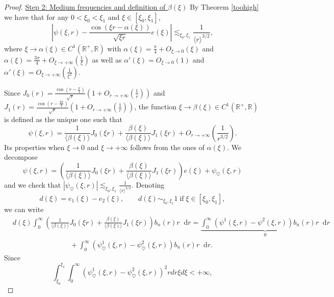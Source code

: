 \documentclass[11 pt]{amsart}
\theoremstyle{definition}
\theoremstyle{remark}
\numberwithin{equation}{section}
\newcommand{\dd}{\mathop{}\!\mathrm{d}}
\begin{document}
\begin{proof}
\medskip

\noindent 
\underline{Step 2: Medium frequencies and definition of $\beta(\xi)$} 
By Theorem \ref{toohigh} we have that for any $0<\xi_0<\xi_1$ and $\xi \in [\xi_0, \xi_1]$,
\[ \left| \psi (\xi, r) - \frac{\cos (\xi r - \alpha (\xi))}{\sqrt{\xi r}} e
   (\xi) \right| \lesssim_{\xi_0, \xi_1} \frac{1}{\langle r \rangle^{3 / 2}},
\]
where $\xi \rightarrow \alpha (\xi) \in C^1 (\mathbb{R}^+, \mathbb{R})$ with
$\alpha (\xi) = \frac{\pi}{4} + O_{\xi \rightarrow 0} (\xi)$ and $\alpha (\xi)
= \frac{3 \pi}{4} + O_{\xi \rightarrow + \infty} \left( \frac{1}{\xi} \right)$
as well as $\alpha' (\xi) = O_{\xi \rightarrow 0} (1)$ and $\alpha' (\xi) =
O_{\xi \rightarrow + \infty} \left( \frac{1}{\xi^2} \right)$.

Since $J_0 (r) = \frac{\cos \left( r - \frac{\pi}{4} \right)}{\sqrt{r}} \left(
1 + O_{r \rightarrow + \infty} \left( \frac{1}{r} \right) \right)$ and $J_1
(r) = \frac{\cos \left( r - \frac{3 \pi}{4} \right)}{\sqrt{r}} \left( 1 +
O_{r \rightarrow + \infty} \left( \frac{1}{r} \right) \right)$, the function
$\xi \rightarrow \beta (\xi) \in C^1 (\mathbb{R}^+, \mathbb{R})$ is defined as
the unique one such that
\[ \psi (\xi, r) = \frac{1}{\langle \beta (\xi) \rangle} J_0 (\xi r) +
   \frac{\beta (\xi)}{\langle \beta (\xi) \rangle} J_1 (\xi r) + O_{r
   \rightarrow + \infty} \left( \frac{1}{r^{3 / 2}} \right) . \]
Its properties when $\xi \rightarrow 0$ and $\xi \rightarrow + \infty$ follows
from the ones of $\alpha (\xi)$. We decompose
\[ \psi (\xi, r) = \left( \frac{1}{\langle \beta (\xi) \rangle} J_0 (\xi r) +
   \frac{\beta (\xi)}{\langle \beta (\xi) \rangle} J_1 (\xi r) \right) e (\xi)
   + \psi_{\heartsuit} (\xi, r) \]
and we check that $| \psi_{\heartsuit} (\xi, r) | \lesssim_{\xi_0, \xi_1}
\frac{1}{\langle r \rangle^{3 / 2}}$. Denoting
$$
d(\xi) = e_1 (\xi) - e_2(\xi), \qquad d(\xi) \sim_{\xi_0,\xi_1} 1 \;\mbox{if}\; \xi \in [\xi_0,\xi_1],
$$
we can write
\begin{align*}
& d(\xi) \int_0^\infty \left( \frac{1}{\langle \beta (\xi) \rangle} J_0 (\xi r) + \frac{\beta (\xi)}{\langle \beta (\xi) \rangle} J_1 (\xi r) \right) b_n (r) r \dd r = \underbrace{\int_0^\infty (\psi^1(\xi,r) - \psi^2(\xi,r)) b_n (r) r \dd r }_{\displaystyle 0} \\
& \qquad \qquad \qquad \qquad + \int_0^\infty (\psi_\heartsuit^1(\xi,r) - \psi_\heartsuit^2(\xi,r)) b_n(r) r \dd r.
\end{align*}
Since
\[ \int_{\xi_0}^{\xi_1} \int_0^\infty (\psi_{\heartsuit}^1 (\xi, r) -
   \psi_{\heartsuit}^2 (\xi, r))^2 r d r \xi d \xi < + \infty, \]

\end{proof}
\end{document}

